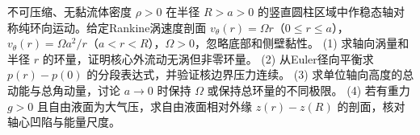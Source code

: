 不可压缩、无黏流体密度 \(\rho>0\) 在半径 \(R>a>0\) 的竖直圆柱区域中作稳态轴对称纯环向运动。给定Rankine涡速度剖面 \(v_\theta(r)=\Omega r\)（\(0\le r\le a\)），\(v_\theta(r)=\Omega a^2/r\)（\(a<r<R\)），\(\Omega>0\)，忽略底部和侧壁黏性。
(1) 求轴向涡量和半径 \(r\) 的环量，证明核心外流动无涡但非零环量。
(2) 从Euler径向平衡求 \(p(r)-p(0)\) 的分段表达式，并验证核边界压力连续。
(3) 求单位轴向高度的总动能与总角动量，讨论 \(a\to0\) 时保持 \(\Omega\) 或保持总环量的不同极限。
(4) 若有重力 \(g>0\) 且自由液面为大气压，求自由液面相对外缘 \(z(r)-z(R)\) 的剖面，核对轴心凹陷与能量尺度。
